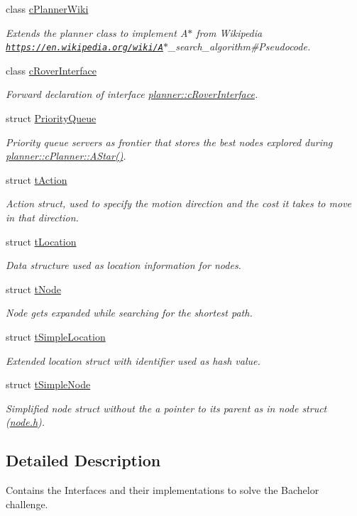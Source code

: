 \begin{DoxyCompactItemize}
class \mbox{\hyperlink{classplanner_1_1c_planner_wiki}{c\+Planner\+Wiki}}
\begin{DoxyCompactList}\small\item\em Extends the planner class to implement A$\ast$ from Wikipedia \href{https://en.wikipedia.org/wiki/A}{\tt https\+://en.\+wikipedia.\+org/wiki/A}$\ast$\+\_\+search\+\_\+algorithm\#\+Pseudocode. \end{DoxyCompactList}\item 
class \mbox{\hyperlink{classplanner_1_1c_rover_interface}{c\+Rover\+Interface}}
\begin{DoxyCompactList}\small\item\em Forward declaration of interface \mbox{\hyperlink{classplanner_1_1c_rover_interface}{planner\+::c\+Rover\+Interface}}. \end{DoxyCompactList}\item 
struct \mbox{\hyperlink{structplanner_1_1_priority_queue}{Priority\+Queue}}
\begin{DoxyCompactList}\small\item\em Priority queue servers as frontier that stores the best nodes explored during \mbox{\hyperlink{classplanner_1_1c_planner_a341e70531266f023ac9461d18979d1ef}{planner\+::c\+Planner\+::\+A\+Star()}}. \end{DoxyCompactList}\item 
struct \mbox{\hyperlink{structplanner_1_1t_action}{t\+Action}}
\begin{DoxyCompactList}\small\item\em Action struct, used to specify the motion direction and the cost it takes to move in that direction. \end{DoxyCompactList}\item 
struct \mbox{\hyperlink{structplanner_1_1t_location}{t\+Location}}
\begin{DoxyCompactList}\small\item\em Data structure used as location information for nodes. \end{DoxyCompactList}\item 
struct \mbox{\hyperlink{structplanner_1_1t_node}{t\+Node}}
\begin{DoxyCompactList}\small\item\em Node gets expanded while searching for the shortest path. \end{DoxyCompactList}\item 
struct \mbox{\hyperlink{structplanner_1_1t_simple_location}{t\+Simple\+Location}}
\begin{DoxyCompactList}\small\item\em Extended location struct with identifier used as hash value. \end{DoxyCompactList}\item 
struct \mbox{\hyperlink{structplanner_1_1t_simple_node}{t\+Simple\+Node}}
\begin{DoxyCompactList}\small\item\em Simplified node struct without the a pointer to its parent as in node struct (\mbox{\hyperlink{node_8h_source}{node.\+h}}). \end{DoxyCompactList}\end{DoxyCompactItemize}


\subsection{Detailed Description}
Contains the Interfaces and their implementations to solve the Bachelor challenge. 